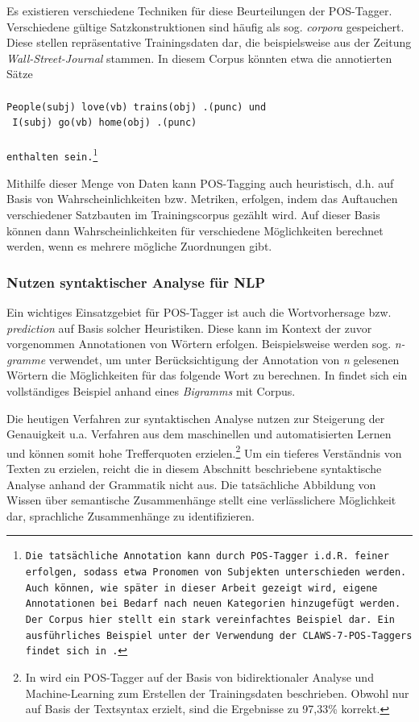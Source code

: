 \documentclass[12pt]{report}
\begin{document}
Es existieren verschiedene Techniken für diese Beurteilungen der POS-Tagger. Verschiedene gültige Satzkonstruktionen sind häufig als sog. \textit{corpora} gespeichert. Diese stellen repräsentative Trainingsdaten dar, die beispielsweise aus der Zeitung \textit{Wall-Street-Journal} stammen. 
In diesem Corpus könnten etwa die annotierten Sätze
\\
\tt
\\People(subj) love(vb) trains(obj) .(punc)
\rm und\\
\tt
I(subj) go(vb) home(obj) .(punc)\\
\\ \rm
enthalten sein.\footnote{Die tatsächliche Annotation kann durch POS-Tagger i.d.R. feiner erfolgen, sodass etwa Pronomen von Subjekten unterschieden werden. Auch können, wie später in dieser Arbeit gezeigt wird, eigene Annotationen bei Bedarf nach neuen Kategorien hinzugefügt werden. Der Corpus hier stellt ein stark vereinfachtes Beispiel dar. Ein ausführliches Beispiel unter der Verwendung der CLAWS-7-POS-Taggers findet sich in \cite{rs18}.}

Mithilfe dieser Menge von Daten kann POS-Tagging auch heuristisch, d.h. auf Basis von Wahrscheinlichkeiten bzw. Metriken, erfolgen, indem das Auftauchen verschiedener Satzbauten im Trainingscorpus gezählt wird. Auf dieser Basis können dann Wahrscheinlichkeiten für verschiedene Möglichkeiten berechnet werden, wenn es mehrere mögliche Zuordnungen gibt. 

\subsubsection{Nutzen syntaktischer Analyse für NLP}
Ein wichtiges Einsatzgebiet für POS-Tagger ist auch die Wortvorhersage bzw. \textit{prediction} auf Basis solcher Heuristiken. Diese kann im Kontext der zuvor vorgenommen Annotationen von Wörtern erfolgen. Beispielsweise werden sog. \textit{n-gramme} verwendet, um unter Berücksichtigung der Annotation von \textit{n} gelesenen Wörtern die Möglichkeiten für das folgende Wort zu berechnen. In \cite{rs18} findet sich ein vollständiges Beispiel anhand eines \textit{Bigramms} mit Corpus.

Die heutigen Verfahren zur syntaktischen Analyse nutzen zur Steigerung der Genauigkeit u.a. Verfahren aus dem maschinellen und automatisierten Lernen und können somit hohe Trefferquoten erzielen.\footnote{In \cite{she07} wird ein POS-Tagger auf der Basis von bidirektionaler Analyse und Machine-Learning zum Erstellen der Trainingsdaten beschrieben. Obwohl nur auf Basis der Textsyntax erzielt, sind die Ergebnisse zu 97,33\% korrekt.} Um ein tieferes Verständnis von Texten zu erzielen, reicht die in diesem Abschnitt beschriebene syntaktische Analyse anhand der Grammatik nicht aus. Die tatsächliche Abbildung von Wissen über semantische Zusammenhänge stellt eine verlässlichere Möglichkeit dar, sprachliche Zusammenhänge zu identifizieren. 
\end{document}
